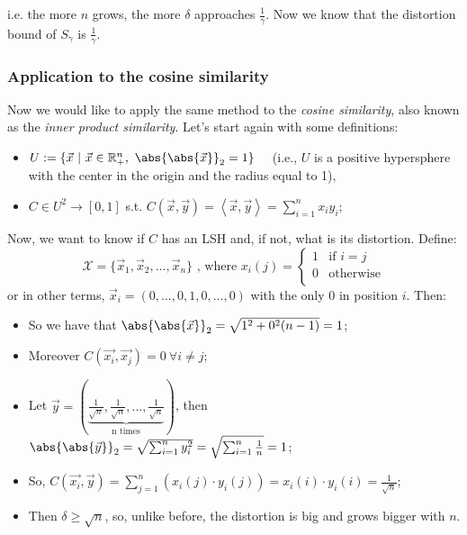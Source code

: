 i.e. the more $n$ grows, the more $\delta$ approaches $\frac{1}{\gamma}$. Now we know that the distortion bound of $S_\gamma$ is $\frac{1}{\gamma}$.


\subsubsection{Application to the cosine similarity}

Now we would like to apply the same method to the \emph{cosine similarity}, also known as the \emph{inner product similarity}.  Let's start again with some definitions:

\begin{itemize}
	\item $U := \{ \vec{x} \ | \ \vec{x} \in \mathbb{R}_+^n, \ \abs{\abs{\vec{x}}}_2=1 \}$ \ \
	(i.e., $U$ is a positive hypersphere with the center in the origin and the radius equal to 1),
	\item $C \in U^2 \to [0,1]$ s.t. $C(\vec{x}, \vec{y}) = \left\langle \vec{x}, \vec{y} \right\rangle = \sum_{i=1}^n x_iy_i$;
\end{itemize}

Now, we want to know if $C$ has an LSH and, if not, what is its distortion. Define:
\[
	\mathcal{X}=\{ \vec{x}_1, \vec{x}_2, ..., \vec{x}_n \} \text{ , where } x_i(j)=\begin{cases}
		1 & \text{if } i = j \\
		0 & \text{otherwise} \\
	\end{cases} 
\]
or in other terms, $\vec{x}_i=(0,...,0,1,0,...,0)$ with the only 0 in position $i$. Then:

\begin{itemize}
	\item So we have that $\abs{\abs{\vec{x}}}_2=\sqrt{1^2+0^2(n-1)}=1$;
	\item Moreover $C(\vec{x_i}, \vec{x_j})=0 \ \forall i\neq j$;
	\item Let $\vec{y}=\left( \underbrace{\frac{1}{\sqrt{n}}, \frac{1}{\sqrt{n}}, ..., \frac{1}{\sqrt{n}}}_\text{n times} \right)$, then $\abs{\abs{\vec{y}}}_2 = \sqrt{\sum_{i=1}^n y_i^2} = \sqrt{\sum_{i=1}^n \frac{1}{n}}=1$;
	\item So, $C(\vec{x_i}, \vec{y})= \sum_{j=1}^n \left( x_i(j) \cdot y_i(j) \right) = x_i(i) \cdot y_i(i) = \frac{1}{\sqrt{n}}$;
	\item Then $\delta \geq \sqrt{n}$, so, unlike before, the distortion is big and grows bigger with $n$.
\end{itemize}

